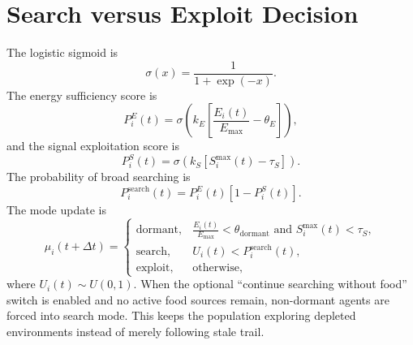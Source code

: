 \documentclass[11pt]{article}
\begin{document}
\section{Search versus Exploit Decision}
The logistic sigmoid is
\begin{equation}
  \sigma(x)=\frac{1}{1+\exp(-x)}.
\end{equation}
The energy sufficiency score is
\begin{equation}
  P_i^E(t)=
  \sigma\left(k_E\left[\frac{E_i(t)}{E_{\max}}-\theta_E\right]\right),
\end{equation}
and the signal exploitation score is
\begin{equation}
  P_i^S(t)=
  \sigma\left(k_S\left[S_i^{\max}(t)-\tau_S\right]\right).
\end{equation}
The probability of broad searching is
\begin{equation}
  P_i^{\mathrm{search}}(t)=P_i^E(t)\left[1-P_i^S(t)\right].
\end{equation}
The mode update is
\begin{equation}
  \mu_i(t+\Delta t)=
  \begin{cases}
  \mathrm{dormant}, &
  \frac{E_i(t)}{E_{\max}}<\theta_{\mathrm{dormant}}
  \text{ and } S_i^{\max}(t)<\tau_S,\\
  \mathrm{search}, & U_i(t)<P_i^{\mathrm{search}}(t),\\
  \mathrm{exploit}, & \text{otherwise},
  \end{cases}
\end{equation}
where $U_i(t)\sim U(0,1)$.
When the optional ``continue searching without food'' switch is enabled and no
active food sources remain, non-dormant agents are forced into search mode. This
keeps the population exploring depleted environments instead of merely following
stale trail.
\end{document}
